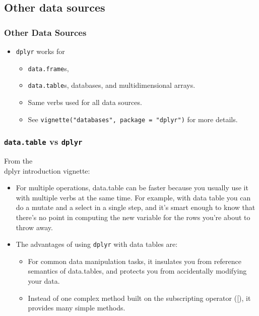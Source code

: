 \documentclass{beamer}\usepackage[]{graphicx}\usepackage[]{color}
\begin{document}

\subsection{Other data sources}%
\begin{frame}[fragile]
  \frametitle{Other Data Sources}
  \begin{itemize}
    \item {\tt dplyr} works for 
      \begin{itemize}
        \item {\tt data.frame}s, \item {\tt data.table}s,
          databases, and multidimensional arrays.
        \item Same verbs used for all data sources.
        \item See {\tt vignette("databases", package =
          "dplyr")} for more details.

      \end{itemize}
  \end{itemize}
\end{frame} 

\begin{frame}[fragile]
  \frametitle{{\tt data.table} vs {\tt dplyr}}
  From the {\\ dplyr} introduction vignette:
  \begin{itemize}
    \item For multiple operations, data.table can be faster
      because you usually use it with multiple verbs at the
      same time. For example, with data table you can do a
      mutate and a select in a single step, and it's smart
      enough to know that there's no point in computing the
      new variable for the rows you're about to throw away.
    \item The advantages of using {\tt dplyr} with data
      tables are:
      \begin{itemize}
        \item For common data manipulation tasks, it
          insulates you from reference semantics of
          data.tables, and protects you from accidentally
          modifying your data.
        \item Instead of one complex method built on the
          subscripting operator ([), it provides many simple
          methods.
      \end{itemize} 
  \end{itemize}
\end{frame} 
\end{document}
